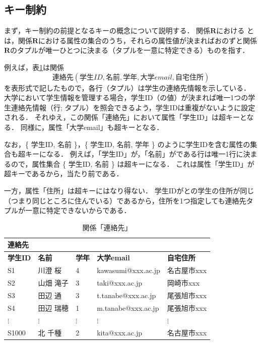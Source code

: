 \subsection{キー制約}
まず，キー制約の前提となるキーの概念について説明する．
関係$\boldsymbol{R}$における とは，関係$\boldsymbol{R}$における属性の集合のうち，それらの属性値が決まればおのずと関係$\boldsymbol{R}$のタプルが唯一ひとつに決まる（タプルを一意に特定できる）ものを指す．

例えば，表\ref{tab:contact-relation}は関係
\begin{equation}
連絡先(学生ID, 名前, 学年, 大学email, 自宅住所)
\end{equation}
を表形式で記したもので，各行（タプル）は学生の連絡先情報を示している．
大学において学生情報を管理する場合，学生ID（の値）が決まれば唯一1つの学生連絡先情報（行; タプル）を照会できるよう，学生IDは重複がないように設定される．
それゆえ，この関係「連絡先」において属性「学生ID」は超キーとなる．
同様に，属性「大学email」も超キーとなる．

なお，\{ 学生ID, 名前 \}，\{ 学生ID, 名前, 学年 \} のように学生IDを含む属性の集合も超キーになる．
例えば，「学生ID」が，「名前」がである行は唯一1行に決まるので，属性集合 \{ 学生ID, 名前 \} は超キーになる．
これは属性「学生ID」が超キーであるから，当たり前である．

一方，属性「住所」は超キーにはなり得ない．
学生IDがとの学生の住所が同じ（つまり同じところに住んでいる）であるから，住所を1つ指定しても連絡先タプルが一意に特定できないからである．


\begin{table}[tb]
\centering
\caption{関係「連絡先」}
\label{tab:contact-relation}
\begin{tabular}{@{}lllll@{}}
連絡先           &             &             &                    &               \\ \midrule
\textbf{学生ID} & \textbf{名前} & \textbf{学年} & \textbf{大学email}   & \textbf{自宅住所} \\ \midrule
S1            & 川澄 桜        & 4           & kawasumi@xxx.ac.jp & 名古屋市xxx       \\
S2            & 山畑 滝子       & 3           & taki@xxx.ac.jp     & 岡崎市xxx        \\
S3            & 田辺 通        & 3           & t.tanabe@xxx.ac.jp & 尾張旭市xxx       \\
S4            & 田辺 瑞穂       & 1           & m.tanabe@xxx.ac.jp & 尾張旭市xxx       \\
$\vdots$      & $\vdots$    & $\vdots$    & $\vdots$           & $\vdots$      \\
S1000         & 北 千種        & 2           & kita@xxx.ac.jp     & 名古屋市xxx       \\ \bottomrule
\end{tabular}
\end{table}


